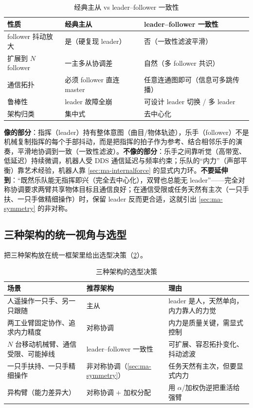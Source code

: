 \begin{table}[H]\centering\small
\caption{经典主从 vs leader--follower 一致性}
\label{tab:ma-leaderfollow-vs}
\begin{tabular}{lll}
\toprule
性质 & 经典主从 & leader--follower 一致性 \\
\midrule
follower 抖动放大 & 是（硬复现 leader） & 否（一致性滤波平滑） \\
扩展到 $N$ follower & 一主多从协调差 & 自然（多 follower 共识） \\
通信拓扑 & 必须 follower 直连 master & 任意连通图即可（信息可多跳传播） \\
鲁棒性 & leader 故障全崩 & 可设计 leader 切换 / 多 leader \\
架构归类 & 集中式 & 去中心化 \\
\bottomrule
\end{tabular}
\end{table}

\begin{insight}
\textbf{像的部分}：指挥（leader）持有整体意图（曲目/物体轨迹），乐手（follower）不是机械复制指挥的每个手部抖动，而是把指挥的拍子作为参考、结合相邻乐手的演奏，平滑地协调到一致（一致性滤波）。\textbf{不像的部分}：乐手之间靠听觉（高带宽、低延迟）持续微调，机器人受 DDS 通信延迟与频率约束；乐队的“内力”（声部平衡）靠艺术经验，机器人靠 \cref{sec:ma-internalforce} 的显式内力环。\textbf{不要延伸到}：“既然乐队能无指挥即兴（完全去中心化），双臂也总能无 leader”——完全对称协调要求两臂共享物体目标且通信良好；在通信受限或任务天然有主次（一只手扶、一只手做精细操作）时，保留 leader 反而更合适，这就引出 \cref{sec:ma-symmetry} 的非对称。
\end{insight}

\subsection{三种架构的统一视角与选型}
\label{sec:ma-arch-select}

把三种架构放在统一框架里给出选型决策（\cref{tab:ma-arch-select}）。

\begin{table}[H]\centering\small
\caption{三种架构的选型决策}
\label{tab:ma-arch-select}
\begin{tabular}{lll}
\toprule
场景 & 推荐架构 & 理由 \\
\midrule
人遥操作一只手、另一只跟随 & 主从 & leader 是人，天然单向，内力靠人的力觉 \\
两工业臂固定协作、追求内力精度 & 对称协调 & 内力是质量关键，需显式控制 \\
$N$ 台移动机械臂、通信受限、可能掉线 & leader--follower 一致性 & 可扩展、容忍拓扑变化、抖动滤波 \\
一只手扶持、一只手精细操作 & 非对称协调（\cref{sec:ma-symmetry}） & 任务天然有主次，但要显式内力 \\
异构臂（能力差异大） & 对称协调 $+$ 加权分配 & 用 $\alpha$/加权伪逆把重活给强臂 \\
\bottomrule
\end{tabular}
\end{table}

